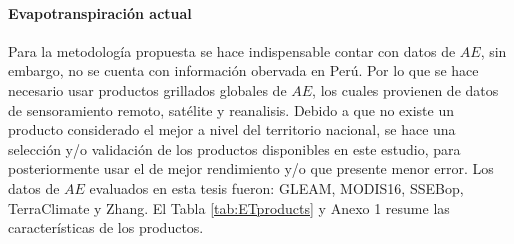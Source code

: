 \documentclass[12pt]{article}
\begin{document}


\clearpage

\paragraph{Evapotranspiración actual}\mbox{}

Para la metodología propuesta se hace indispensable contar con datos de $AE$, sin embargo, no se cuenta con información obervada en Perú. Por lo que se hace necesario usar productos grillados globales de $AE$, los cuales provienen de datos de sensoramiento remoto, satélite y reanalisis. Debido a que no existe un producto considerado el mejor a nivel del territorio nacional, se hace una selección y/o validación de los productos disponibles en este estudio, para posteriormente usar el de mejor rendimiento y/o que presente menor error. Los datos de $AE$ evaluados en esta tesis fueron: GLEAM, MODIS16, SSEBop, TerraClimate y Zhang. El Tabla \ref{tab:ETproducts} y Anexo 1 resume las características de los productos.
\end{document}
